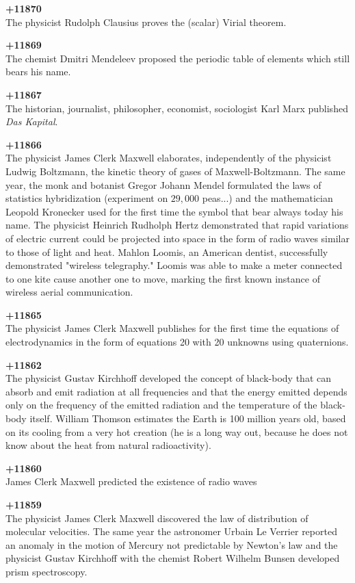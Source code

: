 \textbf{+11870}\\
The physicist Rudolph Clausius proves the (scalar) Virial theorem.

\textbf{+11869}\\
The chemist Dmitri Mendeleev proposed the periodic table of elements which still bears his name.

\textbf{+11867}\\
The historian, journalist, philosopher, economist, sociologist Karl Marx published \textit{Das Kapital}. 

\textbf{+11866}\\
The physicist James Clerk Maxwell elaborates, independently of the physicist Ludwig Boltzmann, the kinetic theory of gases of Maxwell-Boltzmann. The same year, the monk and botanist Gregor Johann Mendel formulated the laws of statistics hybridization (experiment on $29,000$ peas...) and the mathematician Leopold Kronecker used for the first time the symbol that bear always today his name. The physicist Heinrich Rudholph Hertz demonstrated that rapid variations of electric current could be projected into space in the form of radio waves similar to those of light and heat. Mahlon Loomis, an American dentist, successfully demonstrated "wireless telegraphy." Loomis was able to make a meter connected to one kite cause another one to move, marking the first known instance of wireless aerial communication.

\textbf{+11865}\\
The physicist James Clerk Maxwell publishes for the first time the equations of electrodynamics in the form of equations 20 with 20 unknowns using quaternions. 

\textbf{+11862}\\
The physicist Gustav Kirchhoff developed the concept of black-body that can absorb and emit radiation at all frequencies and that the energy emitted depends only on the frequency of the emitted radiation and the temperature of the black-body itself. William Thomson estimates the Earth is 100 million years old, based on its cooling from a very hot creation (he is a long way out, because he does not know about the heat from natural radioactivity).

\textbf{+11860}\\
James Clerk Maxwell predicted the existence of radio waves

\textbf{+11859}\\
The physicist James Clerk Maxwell discovered the law of distribution of molecular velocities. The same year the astronomer Urbain Le Verrier reported an anomaly in the motion of Mercury not predictable by Newton's law and the physicist Gustav Kirchhoff with the chemist Robert Wilhelm Bunsen developed prism spectroscopy. 

